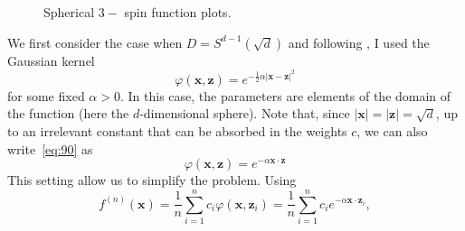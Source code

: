 \documentclass{article}
\begin{document}
 \begin{figure}[H]\centering
{}
\caption{Spherical $ 3-$ spin function plots.}
\label{fig: spherical 3-spin function plot}
\end{figure}

We first consider the case when $D = S^{d-1}(\sqrt{d})$ and following \cite{Rostkoff_2022}, I used the Gaussian kernel
%
\begin{equation}
  \label{eq:90}
  \varphi(\mathbf{x},\mathbf{z}) = e^{-\tfrac12 \alpha |\mathbf{x}-\mathbf{z}|^2}
\end{equation}
%
for some fixed $\alpha >0$. In this case, the parameters
are elements of the domain of the function (here the $d$-dimensional
sphere). 
Note that, since $|\mathbf{x}|=|\mathbf{z}| = \sqrt{d}$, up to an
irrelevant constant that can be absorbed in the weights $c$, we can
also write~\eqref{eq:90} as
%
\begin{equation}
  \label{eq:90red}
  \varphi(\mathbf{x},\mathbf{z}) = e^{-\alpha \mathbf{x}\cdot \mathbf{z}}
\end{equation}
%
This setting allow us to simplify the problem. Using
%
\begin{equation}
  \label{eq:119}
  f^{(n)}(\mathbf{x}) = \frac1n \sum_{i=1}^n c_i \varphi(\mathbf{x},\mathbf{z}_i)
  = \frac1n \sum_{i=1}^n c_i e^{-\alpha \mathbf{x}\cdot \mathbf{z}_i},
\end{equation}
\end{document}
